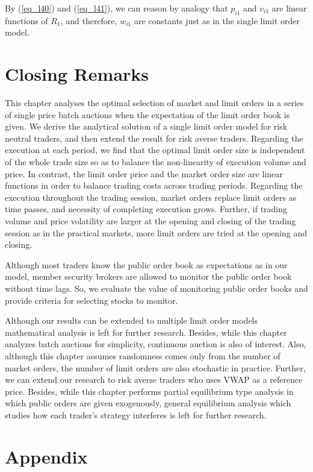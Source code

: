 By (\ref{eq_l40}) and (\ref{eq_l41}), we can reason by analogy that $p_{i1}$ and $v_{i1}$ are linear functions of $R_1$, and therefore, $w_{i1}$ are constants just as in the single limit order model.


\section{Closing Remarks}\label{sec_l5}
This chapter analyses the optimal selection of market and limit orders in a series of single price batch auctions when the expectation of the limit order book is given.  We derive the analytical solution of a single limit order model for risk neutral traders, and then extend the result for risk averse traders.  Regarding the execution at each period, we find that the optimal limit order size is independent of the whole trade size so as to balance the non-linearity of execution volume and price.  In contrast, the limit order price and the market order size are linear functions in order to balance trading costs across trading periods.  Regarding the execution throughout the trading session, market orders replace limit orders as time passes, and necessity of completing execution grows.  Further, if trading volume and price volatility are larger at the opening and closing of the trading session as in the practical markets, more limit orders are tried at the opening and closing.

Although most traders know the public order book as expectations as in our model, member security brokers are allowed to monitor the public order book without time lags.  So, we evaluate the value of monitoring public order books and provide criteria for selecting stocks to monitor.

Although our results can be extended to multiple limit order models mathematical analysis is left for further research.  Besides, while this chapter analyzes batch auctions for simplicity, continuous auction is also of interest.  Also, although this chapter assumes randomness comes only from the number of market orders, the number of limit orders are also stochastic in practice.  Further, we can extend our research to risk averse traders who uses VWAP as a reference price.  Besides, while this chapter performs partial equilibrium type analysis in which public orders are given exogenously, general equilibrium analysis which studies how each trader's strategy interferes is left for further research.

\section{Appendix}\label{sec_lappendix}

